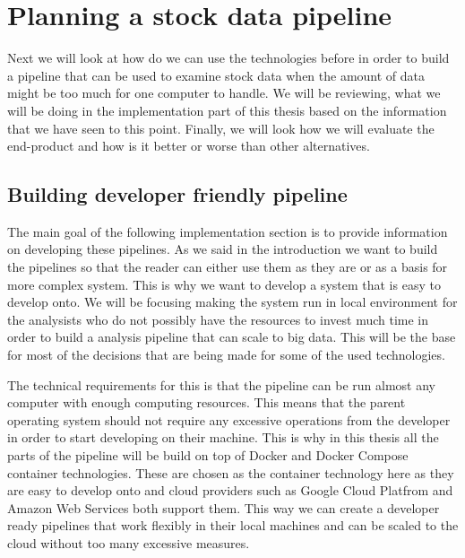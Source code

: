 \chapter{Planning a stock data pipeline}
\label{chapter:methods}


Next we will look at how do we can use the technologies before in order to build a pipeline that can be used to examine stock data when the amount of data might be too much for one computer to handle.
We will be reviewing, what we will be doing in the implementation part of this thesis based on the information that we have seen to this point.
Finally, we will look how we will evaluate the end-product and how is it better or worse than other alternatives.

\section{Building developer friendly pipeline}

The main goal of the following implementation section is to provide information on developing these pipelines.
As we said in the introduction we want to build the pipelines so that the reader can either use them as they are or as a basis for more complex system.
This is why we want to develop a system that is easy to develop onto.
We will be focusing making the system run in local environment for the analysists who do not possibly have the resources to invest much time in order to build a analysis pipeline that can scale to big data.
This will be the base for most of the decisions that are being made for some of the used technologies.

The technical requirements for this is that the pipeline can be run almost any computer with enough computing resources.
This means that the parent operating system should not require any excessive operations from the developer in order to start developing on their machine.
This is why in this thesis all the parts of the pipeline will be build on top of Docker and Docker Compose container technologies.
These are chosen as the container technology here as they are easy to develop onto and cloud providers such as Google Cloud Platfrom and Amazon Web Services both support them. \cite{awsdocker} \cite{gcpdocker}
This way we can create a developer ready pipelines that work flexibly in their local machines and can be scaled to the cloud without too many excessive measures.

